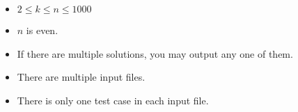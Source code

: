 \begin{itemize}
\tightlist
\item $2 \le k \le n \le 1000$
\item $n$ is even.
\item If there are multiple solutions, you may output any one of them.
\item There are multiple input files.
\item There is only one test case in each input file.
\end{itemize}
